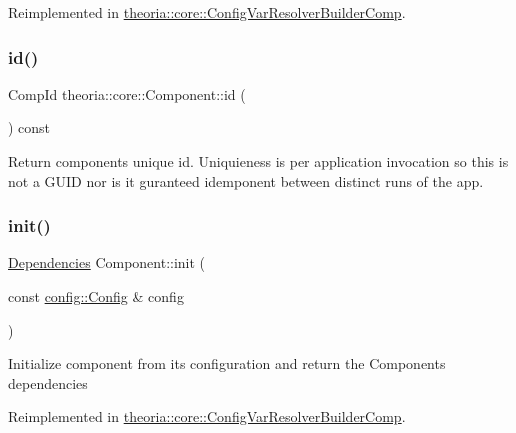 Reimplemented in \hyperlink{classtheoria_1_1core_1_1ConfigVarResolverBuilderComp_ac1e585a908c7e0fa7db4bdf0a8b514bb}{theoria\+::core\+::\+Config\+Var\+Resolver\+Builder\+Comp}.

\mbox{\label{classtheoria_1_1core_1_1Component_ab539df9f996efceda7743fa1b69cd25d}} 
\subsubsection{\texorpdfstring{id()}{id()}}
{\footnotesize\ttfamily Comp\+Id theoria\+::core\+::\+Component\+::id (\begin{DoxyParamCaption}{ }\end{DoxyParamCaption}) const\hspace{0.3cm}{\ttfamily [inline]}}

Return components unique id. Uniquieness is per application invocation so this is not a G\+U\+ID nor is it guranteed idemponent between distinct runs of the app. \mbox{\label{classtheoria_1_1core_1_1Component_a7ed45f6e38442a40666ae4556f794f7d}} 
\subsubsection{\texorpdfstring{init()}{init()}}
{\footnotesize\ttfamily \hyperlink{classtheoria_1_1core_1_1Dependencies}{Dependencies} Component\+::init (\begin{DoxyParamCaption}\item[{const \hyperlink{classtheoria_1_1config_1_1Config}{config\+::\+Config} \&}]{config }\end{DoxyParamCaption})\hspace{0.3cm}{\ttfamily [virtual]}}

Initialize component from its configuration and return the Components dependencies 

Reimplemented in \hyperlink{classtheoria_1_1core_1_1ConfigVarResolverBuilderComp_aadf94c8b3d765667eaf9d7c91ac65342}{theoria\+::core\+::\+Config\+Var\+Resolver\+Builder\+Comp}.

\mbox{\label{classtheoria_1_1core_1_1Component_ae0a32f194c007fe419ec9ae9303025fc}} 

